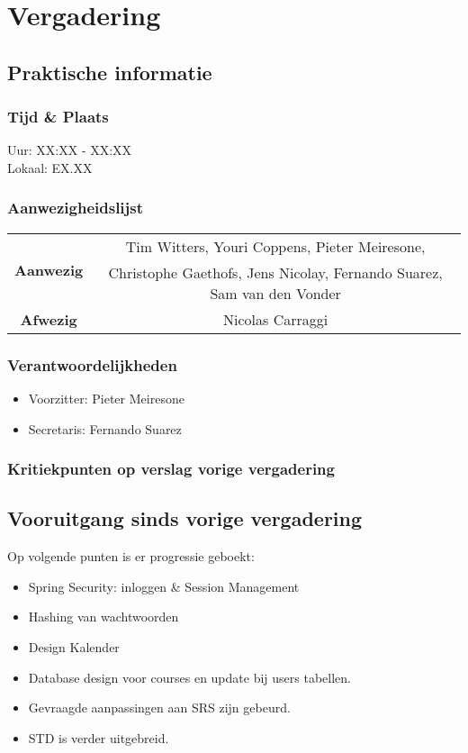 \section{Vergadering \MeetingDate}
\subsection{Praktische informatie}
\subsubsection{Tijd \& Plaats}
Uur: XX:XX - XX:XX
\\
Lokaal: EX.XX
\subsubsection{Aanwezigheidslijst}
\begin{table}[htbp]
	\centering
	\begin{tabular}{c|c}
		\multirow{2}{*}{\textbf{Aanwezig}} & Tim Witters, Youri Coppens, Pieter Meiresone, \\
		& Christophe Gaethofs, Jens Nicolay, Fernando Suarez, Sam van den Vonder \\
		\hline
		\textbf{Afwezig} & Nicolas Carraggi \\
	\end{tabular}
\end{table}

\subsubsection{Verantwoordelijkheden}
\begin{itemize}
	\item Voorzitter: Pieter Meiresone
	\item Secretaris: Fernando Suarez
\end{itemize}

\subsubsection{Kritiekpunten op verslag vorige vergadering}

\subsection{Vooruitgang sinds vorige vergadering} \label{sec:vooruitgangSindsVorigeVergadering}
Op volgende punten is er progressie geboekt:
\begin{itemize}
	\item Spring Security: inloggen \& Session Management
	\item Hashing van wachtwoorden
	\item Design Kalender
	\item Database design voor courses en update bij users tabellen.
	\item Gevraagde aanpassingen aan SRS zijn gebeurd.
	\item STD is verder uitgebreid.
\end{itemize}
